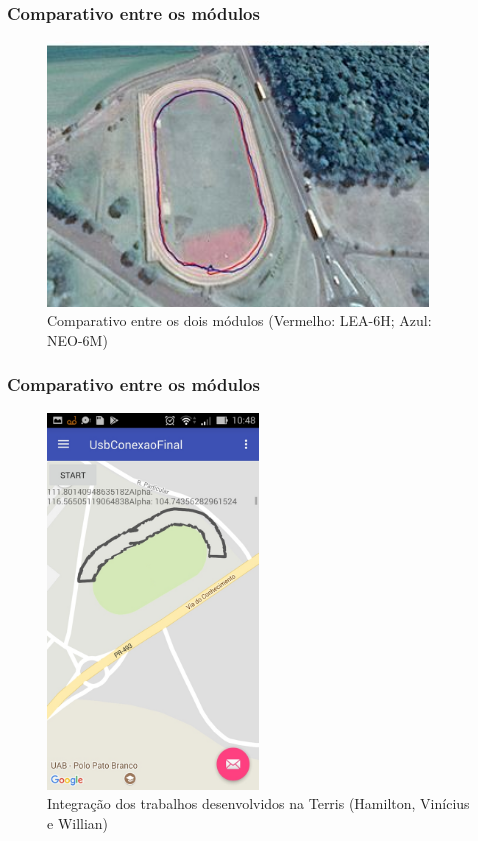 \begin{frame}
\frametitle{Comparativo entre os módulos}

	\begin{figure}[]
	 \centering
	 \captionsetup{width=0.9\textwidth,font=footnotesize,textfont=bf}
	 \includegraphics[width=0.9\textwidth,keepaspectratio]{Figuras/teste.jpg}
	 \caption{Comparativo entre os dois módulos (Vermelho: LEA-6H; Azul: NEO-6M)}
	\end{figure}
\end{frame}



\begin{frame}
\frametitle{Comparativo entre os módulos}
	
	\begin{figure}[]
	 \centering
	 \captionsetup{width=\textwidth,font=footnotesize,textfont=bf}
	 \includegraphics[width=0.5\textwidth,height=0.75\textheight,keepaspectratio]{Figuras/integracao.jpg}
	 \caption{Integração dos trabalhos desenvolvidos na Terris (Hamilton, Vinícius e Willian)}
	\end{figure}
	
\end{frame}




